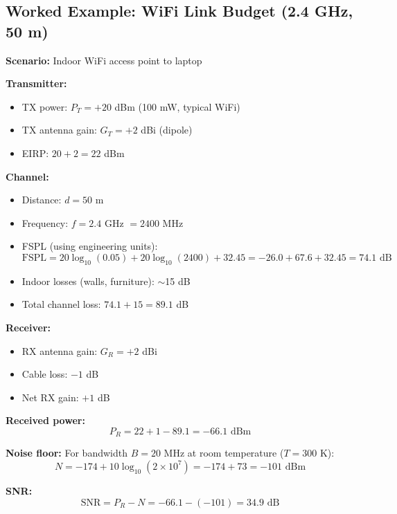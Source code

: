 \subsection{Worked Example: WiFi Link Budget (2.4 GHz, 50 m)}

\textbf{Scenario:} Indoor WiFi access point to laptop

\textbf{Transmitter:}
\begin{itemize}
\item TX power: $P_T = +20$ dBm (100 mW, typical WiFi)
\item TX antenna gain: $G_T = +2$ dBi (dipole)
\item EIRP: $20 + 2 = 22$ dBm
\end{itemize}

\textbf{Channel:}
\begin{itemize}
\item Distance: $d = 50$ m
\item Frequency: $f = 2.4$ GHz $= 2400$ MHz
\item FSPL (using engineering units):
\begin{equation}
\text{FSPL} = 20\log_{10}(0.05) + 20\log_{10}(2400) + 32.45 = -26.0 + 67.6 + 32.45 = 74.1 \text{ dB}
\end{equation}
\item Indoor losses (walls, furniture): $\sim$15 dB
\item Total channel loss: $74.1 + 15 = 89.1$ dB
\end{itemize}

\textbf{Receiver:}
\begin{itemize}
\item RX antenna gain: $G_R = +2$ dBi
\item Cable loss: $-1$ dB
\item Net RX gain: $+1$ dB
\end{itemize}

\textbf{Received power:}
\begin{equation}
P_R = 22 + 1 - 89.1 = -66.1 \text{ dBm}
\end{equation}

\textbf{Noise floor:} For bandwidth $B = 20$ MHz at room temperature ($T = 300$ K):
\begin{equation}
N = -174 + 10\log_{10}(2 \times 10^7) = -174 + 73 = -101 \text{ dBm}
\end{equation}

\textbf{SNR:}
\begin{equation}
\text{SNR} = P_R - N = -66.1 - (-101) = 34.9 \text{ dB}
\end{equation}

